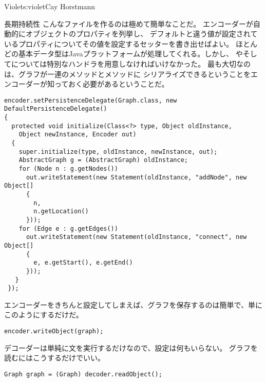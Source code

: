\begin{aosachapter}{Violet}{s:violet}{Cay Horstmann}
\begin{aosasect1}{長期持続性}
こんなファイルを作るのは極めて簡単なことだ。
エンコーダーが自動的にオブジェクトのプロパティを列挙し、
デフォルトと違う値が設定されているプロパティについてその値を設定するセッターを書き出せばよい。
ほとんどの基本データ型はJavaプラットフォームが処理してくれる。しかし、
やそしてについては特別なハンドラを用意しなければいけなかった。
最も大切なのは、グラフが一連のメソッドとメソッドに
シリアライズできるということをエンコーダーが知っておく必要があるということだ。

\begin{verbatim}
encoder.setPersistenceDelegate(Graph.class, new DefaultPersistenceDelegate()
{
  protected void initialize(Class<?> type, Object oldInstance, 
    Object newInstance, Encoder out)
  {
    super.initialize(type, oldInstance, newInstance, out);
    AbstractGraph g = (AbstractGraph) oldInstance;
    for (Node n : g.getNodes())
      out.writeStatement(new Statement(oldInstance, "addNode", new Object[]
      {
        n, 
        n.getLocation()
      }));
    for (Edge e : g.getEdges())
      out.writeStatement(new Statement(oldInstance, "connect", new Object[]
      {
        e, e.getStart(), e.getEnd()
      }));
   } 
 });
\end{verbatim}

エンコーダーをきちんと設定してしまえば、グラフを保存するのは簡単で、単にこのようにするだけだ。

\begin{verbatim}
encoder.writeObject(graph);
\end{verbatim}

\noindent
デコーダーは単純に文を実行するだけなので、設定は何もいらない。
グラフを読むにはこうするだけでいい。

\begin{verbatim}
Graph graph = (Graph) decoder.readObject();
\end{verbatim}


\end{aosasect1}
\end{aosachapter}
